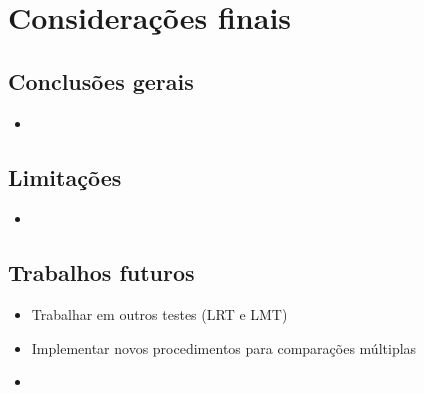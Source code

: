 \chapter{Considerações finais}


\section{Conclusões gerais}

\begin{itemize}
  \item 
\end{itemize}


\section{Limitações}

\begin{itemize}
  \item 
\end{itemize}


\section{Trabalhos futuros}

\begin{itemize}
  \item Trabalhar em outros testes (LRT e LMT)
  \item Implementar novos procedimentos para comparações múltiplas
  \item 
\end{itemize}


